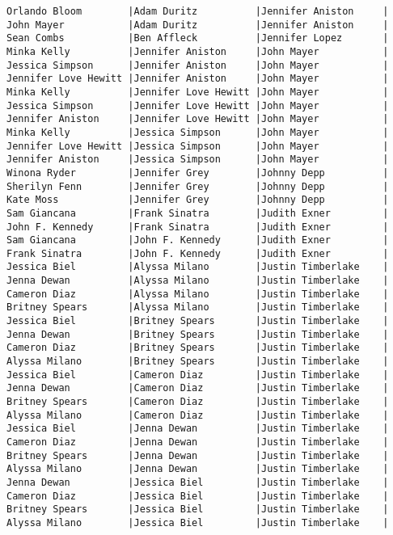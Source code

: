\documentclass{article}
\begin{document}
\begin{verbatim}
Orlando Bloom        |Adam Duritz          |Jennifer Aniston     |
John Mayer           |Adam Duritz          |Jennifer Aniston     |
Sean Combs           |Ben Affleck          |Jennifer Lopez       |
Minka Kelly          |Jennifer Aniston     |John Mayer           |
Jessica Simpson      |Jennifer Aniston     |John Mayer           |
Jennifer Love Hewitt |Jennifer Aniston     |John Mayer           |
Minka Kelly          |Jennifer Love Hewitt |John Mayer           |
Jessica Simpson      |Jennifer Love Hewitt |John Mayer           |
Jennifer Aniston     |Jennifer Love Hewitt |John Mayer           |
Minka Kelly          |Jessica Simpson      |John Mayer           |
Jennifer Love Hewitt |Jessica Simpson      |John Mayer           |
Jennifer Aniston     |Jessica Simpson      |John Mayer           |
Winona Ryder         |Jennifer Grey        |Johnny Depp          |
Sherilyn Fenn        |Jennifer Grey        |Johnny Depp          |
Kate Moss            |Jennifer Grey        |Johnny Depp          |
Sam Giancana         |Frank Sinatra        |Judith Exner         |
John F. Kennedy      |Frank Sinatra        |Judith Exner         |
Sam Giancana         |John F. Kennedy      |Judith Exner         |
Frank Sinatra        |John F. Kennedy      |Judith Exner         |
Jessica Biel         |Alyssa Milano        |Justin Timberlake    |
Jenna Dewan          |Alyssa Milano        |Justin Timberlake    |
Cameron Diaz         |Alyssa Milano        |Justin Timberlake    |
Britney Spears       |Alyssa Milano        |Justin Timberlake    |
Jessica Biel         |Britney Spears       |Justin Timberlake    |
Jenna Dewan          |Britney Spears       |Justin Timberlake    |
Cameron Diaz         |Britney Spears       |Justin Timberlake    |
Alyssa Milano        |Britney Spears       |Justin Timberlake    |
Jessica Biel         |Cameron Diaz         |Justin Timberlake    |
Jenna Dewan          |Cameron Diaz         |Justin Timberlake    |
Britney Spears       |Cameron Diaz         |Justin Timberlake    |
Alyssa Milano        |Cameron Diaz         |Justin Timberlake    |
Jessica Biel         |Jenna Dewan          |Justin Timberlake    |
Cameron Diaz         |Jenna Dewan          |Justin Timberlake    |
Britney Spears       |Jenna Dewan          |Justin Timberlake    |
Alyssa Milano        |Jenna Dewan          |Justin Timberlake    |
Jenna Dewan          |Jessica Biel         |Justin Timberlake    |
Cameron Diaz         |Jessica Biel         |Justin Timberlake    |
Britney Spears       |Jessica Biel         |Justin Timberlake    |
Alyssa Milano        |Jessica Biel         |Justin Timberlake    |

\end{verbatim}
\end{document}
